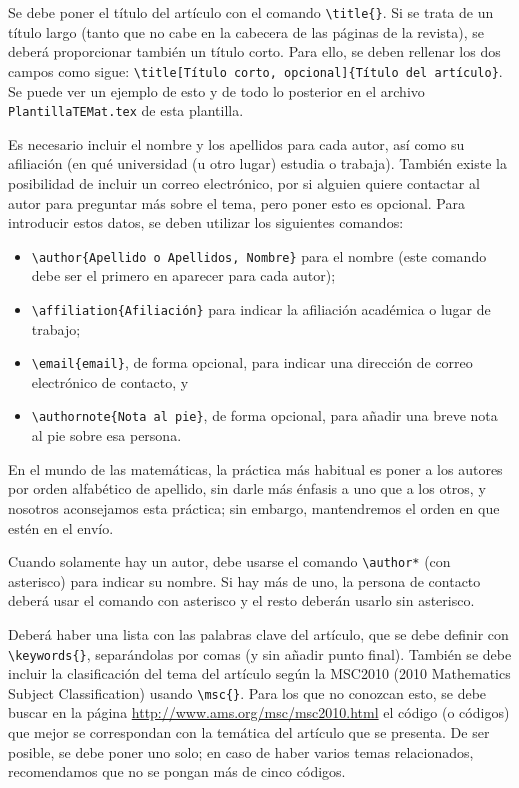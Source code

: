 \documentclass{TEMat-article}
\begin{document}
Se debe poner el título del artículo con el comando \verb+\title{}+.
Si se trata de un título largo (tanto que no cabe en la cabecera de las páginas de la revista), se deberá proporcionar también un título corto.
Para ello, se deben rellenar los dos campos como sigue: \verb+\title[Título corto, opcional]{Título del artículo}+.
Se puede ver un ejemplo de esto y de todo lo posterior en el archivo \verb+PlantillaTEMat.tex+ de esta plantilla.

Es necesario incluir el nombre y los apellidos para cada autor, así como su afiliación (en qué universidad (u otro lugar) estudia o trabaja).
También existe la posibilidad de incluir un correo electrónico, por si alguien quiere contactar al autor para preguntar más sobre el tema, pero poner esto es opcional.
Para introducir estos datos, se deben utilizar los siguientes comandos:
\begin{itemize}
\item \verb+\author{Apellido o Apellidos, Nombre}+ para el nombre (este comando debe ser el primero en aparecer para cada autor);
\item \verb+\affiliation{Afiliación}+ para indicar la afiliación académica o lugar de trabajo;
\item \verb+\email{email}+, de forma opcional, para indicar una dirección de correo electrónico de contacto, y
\item \verb+\authornote{Nota al pie}+, de forma opcional, para añadir una breve nota al pie sobre esa persona.
\end{itemize}
En el mundo de las matemáticas, la práctica más habitual es poner a los autores por orden alfabético de apellido, sin darle más énfasis a uno que a los otros, y nosotros aconsejamos esta práctica; sin embargo, mantendremos el orden en que estén en el envío.

Cuando solamente hay un autor, debe usarse el comando \verb+\author*+ (con asterisco) para indicar su nombre. Si hay más de uno, la persona de contacto deberá usar el comando con asterisco y el resto deberán usarlo sin asterisco.

Deberá haber una lista con las palabras clave del artículo, que se debe definir con \verb+\keywords{}+, separándolas por comas (y sin añadir punto final).
También se debe incluir la clasificación del tema del artículo según la MSC2010 (2010 Mathematics Subject Classification) usando \verb+\msc{}+.
Para los que no conozcan esto, se debe buscar en la página \url{http://www.ams.org/msc/msc2010.html} el código (o códigos) que mejor se correspondan con la temática del artículo que se presenta.
De ser posible, se debe poner uno solo; en caso de haber varios temas relacionados, recomendamos que no se pongan más de cinco códigos.
\end{document}

